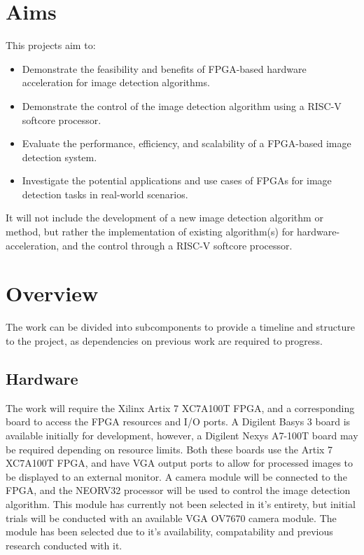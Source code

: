 \section{Aims}
This projects aim to:
\begin{itemize}
    \item Demonstrate the feasibility and benefits of FPGA-based hardware acceleration for image detection algorithms.
    \item Demonstrate the control of the image detection algorithm using a RISC-V softcore processor.
    \item Evaluate the performance, efficiency, and scalability of a FPGA-based image detection system.
    \item Investigate the potential applications and use cases of FPGAs for image detection tasks in real-world scenarios.
\end{itemize}

It will not include the development of a new image detection algorithm or method, but rather the implementation of existing algorithm(s) for hardware-acceleration, and the control through a RISC-V softcore processor.

\section{Overview}
The work can be divided into subcomponents to provide a timeline and structure to the project, as dependencies on previous work are required to progress.

\subsection{Hardware}
The work will require the Xilinx Artix 7 XC7A100T FPGA, and a corresponding board to access the FPGA resources and I/O ports.
A Digilent Basys 3 board is available initially for development, however, a Digilent Nexys A7-100T board may be required depending on resource limits.
Both these boards use the Artix 7 XC7A100T FPGA, and have VGA output ports to allow for processed images to be displayed to an external monitor.
A camera module will be connected to the FPGA, and the NEORV32 processor will be used to control the image detection algorithm.
This module has currently not been selected in it's entirety, but initial trials will be conducted with an available VGA OV7670 camera module.
The module has been selected due to it's availability, compatability and previous research \cite{SoCImage} conducted with it.

